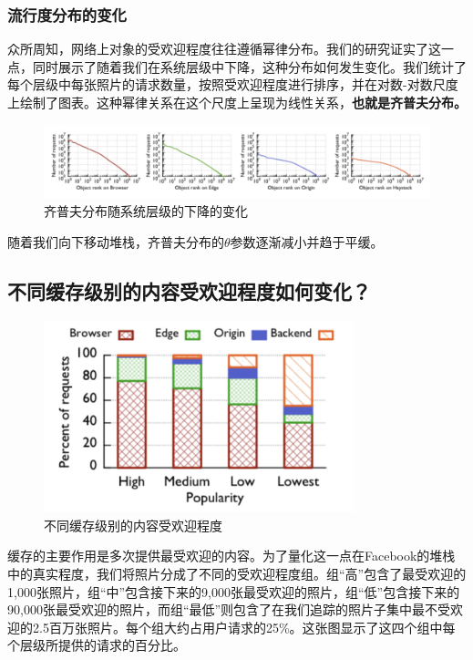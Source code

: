 \subsubsection{流行度分布的变化}

众所周知，网络上对象的受欢迎程度往往遵循幂律分布。我们的研究证实了这一点，同时展示了随着我们在系统层级中下降，这种分布如何发生变化。我们统计了每个层级中每张照片的请求数量，按照受欢迎程度进行排序，并在对数-对数尺度上绘制了图表。这种幂律关系在这个尺度上呈现为线性关系，\textbf{也就是齐普夫分布。}

\begin{figure}[h]
    \centering
    \includegraphics[width=16cm]{res/fb1.png}
    \caption{齐普夫分布随系统层级的下降的变化}
\end{figure}

随着我们向下移动堆栈，齐普夫分布的$\theta$参数逐渐减小并趋于平缓。

\subsection{不同缓存级别的内容受欢迎程度如何变化？}

\begin{figure}[h]
    \centering
    \includegraphics[width=9cm]{res/fb2.png}
    \caption{不同缓存级别的内容受欢迎程度 }
\end{figure}
缓存的主要作用是多次提供最受欢迎的内容。为了量化这一点在Facebook的堆栈中的真实程度，我们将照片分成了不同的受欢迎程度组。组“高”包含了最受欢迎的1,000张照片，组“中”包含接下来的9,000张最受欢迎的照片，组“低”包含接下来的90,000张最受欢迎的照片，而组“最低”则包含了在我们追踪的照片子集中最不受欢迎的2.5百万张照片。每个组大约占用户请求的25\%。这张图显示了这四个组中每个层级所提供的请求的百分比。

